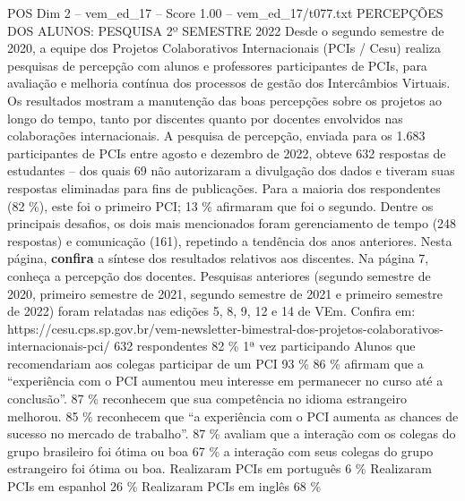 \begin{textsample}{POS Dim 2 – vem\_ed\_17 – Score 1.00 – vem\_ed\_17/t077.txt}  \label{ex:f2_pos_128}
PERCEPÇÕES DOS ALUNOS: PESQUISA 2º SEMESTRE 2022 Desde o segundo semestre de 2020, a equipe dos Projetos Colaborativos Internacionais (PCIs / Cesu) realiza pesquisas de percepção com alunos e professores participantes de PCIs, para avaliação e melhoria contínua dos processos de gestão dos Intercâmbios Virtuais.
Os resultados mostram a manutenção das boas percepções sobre os projetos ao longo do tempo, tanto por discentes quanto por docentes envolvidos nas colaborações internacionais.
A pesquisa de percepção, enviada para os 1.683 participantes de PCIs entre agosto e dezembro de 2022, obteve 632 respostas de estudantes – dos quais 69 não autorizaram a divulgação dos dados e tiveram suas respostas eliminadas para fins de publicações.
Para a maioria dos respondentes (82 \%), este foi o primeiro PCI; 13 \% afirmaram que foi o segundo.
Dentre os principais desafios, os dois mais mencionados foram gerenciamento de tempo (248 respostas) e comunicação (161), repetindo a tendência dos anos anteriores.
Nesta página, \textbf{confira} a síntese dos resultados relativos aos discentes.
Na página 7, conheça a percepção dos docentes.
Pesquisas anteriores (segundo semestre de 2020, primeiro semestre de 2021, segundo semestre de 2021 e primeiro semestre de 2022) foram relatadas nas edições 5, 8, 9, 12 e 14 de VEm.
Confira em: https://cesu.cps.sp.gov.br/vem-newsletter-bimestral-dos-projetos-colaborativos-internacionais-pci/ 632 respondentes 82 \% 1ª vez participando Alunos que recomendariam aos colegas participar de um PCI 93 \% 86 \% afirmam que a “experiência com o PCI aumentou meu interesse em permanecer no curso até a conclusão”. 87 \% reconhecem que sua competência no idioma estrangeiro melhorou. 85 \% reconhecem que “a experiência com o PCI aumenta as chances de sucesso no mercado de trabalho”. 87 \% avaliam que a interação com os colegas do grupo brasileiro foi ótima ou boa 67 \% a interação com seus colegas do grupo estrangeiro foi ótima ou boa.
Realizaram PCIs em português 6 \% Realizaram PCIs em espanhol 26 \% Realizaram PCIs em inglês 68 \%

\end{textsample}
